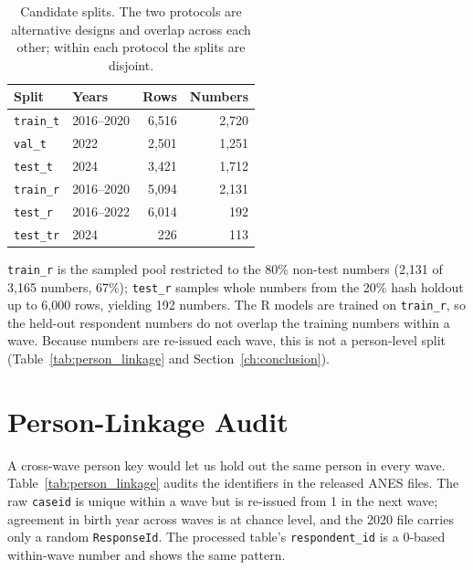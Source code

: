 \begin{table}[h]
\centering
\small
\caption{Candidate splits. The two protocols are alternative designs and overlap
across each other; within each protocol the splits are disjoint.}
\label{tab:splits}
\begin{tabular}{llrr}
\toprule
Split & Years & Rows & Numbers \\
\midrule
\texttt{train\_t} & 2016--2020 & 6,516 & 2,720 \\
\texttt{val\_t} & 2022 & 2,501 & 1,251 \\
\texttt{test\_t} & 2024 & 3,421 & 1,712 \\
\texttt{train\_r} & 2016--2020 & 5,094 & 2,131 \\
\texttt{test\_r} & 2016--2022 & 6,014 & 192 \\
\texttt{test\_tr} & 2024 & 226 & 113 \\
\bottomrule
\end{tabular}
\par\smallskip\footnotesize
\texttt{train\_r} is the sampled pool restricted to the 80\% non-test numbers
(2,131 of 3,165 numbers, 67\%); \texttt{test\_r} samples whole numbers from the
20\% hash holdout up to 6,000 rows, yielding 192 numbers. The R models are trained
on \texttt{train\_r}, so the held-out respondent numbers do not overlap the
training numbers within a wave. Because numbers are re-issued each wave, this is
not a person-level split (Table~\ref{tab:person_linkage} and
Section~\ref{ch:conclusion}).
\end{table}

\section{Person-Linkage Audit}
\label{app:person_linkage}

A cross-wave person key would let us hold out the same person in every wave.
Table~\ref{tab:person_linkage} audits the identifiers in the released ANES files.
The raw \texttt{caseid} is unique within a wave but is re-issued from 1 in the
next wave; agreement in birth year across waves is at chance level, and the 2020
file carries only a random \texttt{ResponseId}. The processed table's
\texttt{respondent\_id} is a 0-based within-wave number and shows the same pattern.


